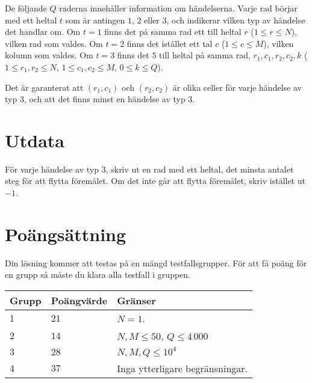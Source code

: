 De följande $Q$ raderna innehåller information om händelserna. Varje rad börjar med ett heltal $t$ som är antingen $1$, $2$ eller $3$,
och indikerar vilken typ av händelse det handlar om. Om $t = 1$ finns det på samma rad ett till heltal $r$ ($1 \leq r \leq N$), vilken 
rad som valdes. Om $t = 2$ finns det istället ett tal $c$ ($1 \leq c \leq M$), vilken kolumn som valdes. Om $t = 3$ finns det $5$ till
heltal på samma rad, $r_1, c_1, r_2, c_2, k$ ($1 \leq r_1, r_2 \leq N$, $1 \leq c_1, c_2 \leq M$, $0 \leq k \leq Q$).

Det är garanterat att $(r_1, c_1)$ och $(r_2, c_2)$ är olika celler för varje händelse av typ $3$, och att det finns minst en händelse av typ $3$.

\section*{Utdata}
För varje händelse av typ $3$, skriv ut en rad med ett heltal, det minsta antalet steg för att flytta föremålet. Om det inte går att
flytta föremålet, skriv istället ut $-1$.

\section*{Poängsättning}
Din lösning kommer att testas på en mängd testfallsgrupper.
För att få poäng för en grupp så måste du klara alla testfall i gruppen.

\noindent
\begin{tabular}{| l | l | l |}
\hline
Grupp & Poängvärde & Gränser \\ \hline
$1$   & $21$       & $N = 1$. \\ \hline
$2$   & $14$       & $N,M \leq 50$, $Q \leq 4\,000$ \\ \hline
$3$   & $28$       & $N,M,Q \leq 10^4$ \\ \hline
$4$   & $37$       & Inga ytterligare begränsningar. \\ \hline

\end{tabular}